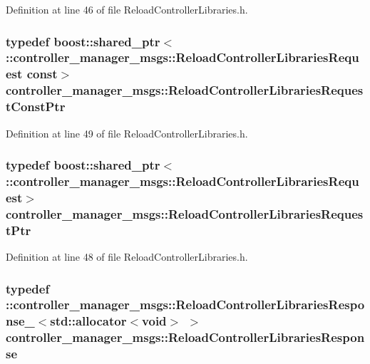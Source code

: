 \-Definition at line 46 of file \-Reload\-Controller\-Libraries.\-h.

\subsubsection[{\-Reload\-Controller\-Libraries\-Request\-Const\-Ptr}]{\setlength{\rightskip}{0pt plus 5cm}typedef boost\-::shared\-\_\-ptr$<$ \-::{\bf controller\-\_\-manager\-\_\-msgs\-::\-Reload\-Controller\-Libraries\-Request} const$>$ {\bf controller\-\_\-manager\-\_\-msgs\-::\-Reload\-Controller\-Libraries\-Request\-Const\-Ptr}}\label{namespacecontroller__manager__msgs_acbad0f84ce688401b9cf79e7ce8a67a4}


\-Definition at line 49 of file \-Reload\-Controller\-Libraries.\-h.

\subsubsection[{\-Reload\-Controller\-Libraries\-Request\-Ptr}]{\setlength{\rightskip}{0pt plus 5cm}typedef boost\-::shared\-\_\-ptr$<$ \-::{\bf controller\-\_\-manager\-\_\-msgs\-::\-Reload\-Controller\-Libraries\-Request}$>$ {\bf controller\-\_\-manager\-\_\-msgs\-::\-Reload\-Controller\-Libraries\-Request\-Ptr}}\label{namespacecontroller__manager__msgs_a2ba5dcf34a68735219a72df146c32b29}


\-Definition at line 48 of file \-Reload\-Controller\-Libraries.\-h.

\subsubsection[{\-Reload\-Controller\-Libraries\-Response}]{\setlength{\rightskip}{0pt plus 5cm}typedef \-::{\bf controller\-\_\-manager\-\_\-msgs\-::\-Reload\-Controller\-Libraries\-Response\-\_\-}$<$std\-::allocator$<$void$>$ $>$ {\bf controller\-\_\-manager\-\_\-msgs\-::\-Reload\-Controller\-Libraries\-Response}}\label{namespacecontroller__manager__msgs_af7ed8cf9d20896dc74a996c2a8941027}


